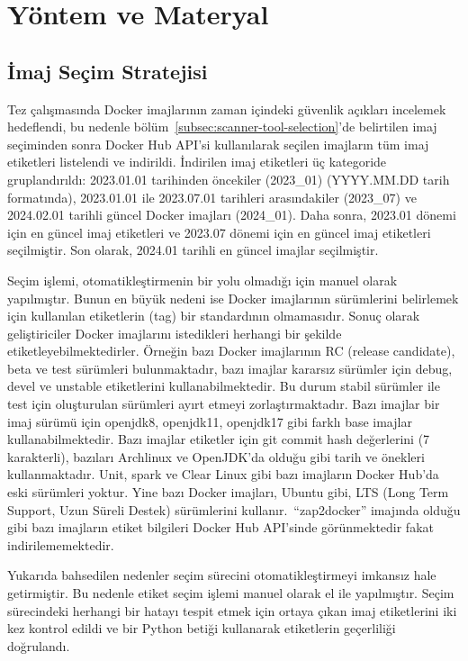 \section{Yöntem ve Materyal}

\subsection{İmaj Seçim Stratejisi}\label{subsec:image-selection-strategy}

Tez çalışmasında Docker imajlarının zaman içindeki güvenlik açıkları incelemek hedeflendi, bu nedenle bölüm~\ref{subsec:scanner-tool-selection}'de belirtilen imaj seçiminden sonra Docker Hub API'si kullanılarak seçilen imajların tüm imaj etiketleri listelendi ve indirildi. İndirilen imaj etiketleri üç kategoride gruplandırıldı: 2023.01.01 tarihinden öncekiler (2023\_01) (YYYY.MM.DD tarih formatında), 2023.01.01 ile 2023.07.01 tarihleri arasındakiler (2023\_07) ve 2024.02.01 tarihli güncel Docker imajları (2024\_01). Daha sonra, 2023.01 dönemi için en güncel imaj etiketleri ve 2023.07 dönemi için en güncel imaj etiketleri seçilmiştir. Son olarak, 2024.01 tarihli en güncel imajlar seçilmiştir.

Seçim işlemi, otomatikleştirmenin bir yolu olmadığı için manuel olarak yapılmıştır. Bunun en büyük nedeni ise Docker imajlarının sürümlerini belirlemek için kullanılan etiketlerin (tag) bir standardının olmamasıdır. Sonuç olarak geliştiriciler Docker imajlarını istedikleri herhangi bir şekilde etiketleyebilmektedirler. Örneğin bazı Docker imajlarının RC (release candidate), beta ve test sürümleri bulunmaktadır, bazı imajlar kararsız sürümler için debug, devel ve unstable etiketlerini kullanabilmektedir. Bu durum stabil sürümler ile test için oluşturulan sürümleri ayırt etmeyi zorlaştırmaktadır. Bazı imajlar bir imaj sürümü için openjdk8, openjdk11, openjdk17 gibi farklı base imajlar kullanabilmektedir. Bazı imajlar etiketler için git commit hash değerlerini (7 karakterli), bazıları Archlinux ve OpenJDK'da olduğu gibi tarih ve önekleri kullanmaktadır. Unit, spark ve Clear Linux gibi bazı imajların Docker Hub'da eski sürümleri yoktur. Yine bazı Docker imajları, Ubuntu gibi, LTS (Long Term Support, Uzun Süreli Destek) sürümlerini kullanır.\ ``zap2docker'' imajında olduğu gibi bazı imajların etiket bilgileri Docker Hub API'sinde görünmektedir fakat indirilememektedir.

Yukarıda bahsedilen nedenler seçim sürecini otomatikleştirmeyi imkansız hale getirmiştir. Bu nedenle etiket seçim işlemi manuel olarak el ile yapılmıştır. Seçim sürecindeki herhangi bir hatayı tespit etmek için ortaya çıkan imaj etiketlerini iki kez kontrol edildi ve bir Python betiği kullanarak etiketlerin geçerliliği doğrulandı.

